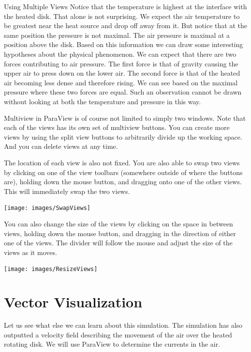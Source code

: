 \begin{exercise}{Using Multiple Views}
  Notice that the temperature is highest at the interface with the heated
  disk.  That alone is not surprising.  We expect the air temperature to be
  greatest near the heat source and drop off away from it.  But notice that
  at the same position the pressure is not maximal.  The air pressure is
  maximal at a position above the disk.  Based on this information we can
  draw some interesting hypotheses about the physical phenomenon.  We can
  expect that there are two forces contributing to air pressure.  The first
  force is that of gravity causing the upper air to press down on the lower
  air.  The second force is that of the heated air becoming less dense and
  therefore rising.  We can see based on the maximal pressure where these
  two forces are equal.  Such an observation cannot be drawn without
  looking at both the temperature and pressure in this way.
\end{exercise}

Multiview in ParaView is of course not limited to simply two windows.  Note
that each of the views has its own set of multiview buttons.  You can
create more views by using the split view buttons \splitViewH \splitViewV
to arbitrarily divide up the working space.  And you can delete views
\deleteView at any time.

The location of each view is also not fixed.  You are also able to swap two
views by clicking on one of the view toolbars (somewhere outside of where
the buttons are), holding down the mouse button, and dragging onto one of
the other views.  This will immediately swap the two views.

\begin{inlinefig}
  \texttt{[image: images/SwapViews]}
\end{inlinefig}

You can also change the size of the views by clicking on the space in
between views, holding down the mouse button, and dragging in the direction
of either one of the views.  The divider will follow the mouse and adjust
the size of the views as it moves.

\begin{inlinefig}
  \texttt{[image: images/ResizeViews]}
\end{inlinefig}


\section{Vector Visualization}

Let us see what else we can learn about this simulation.  The simulation
has also outputted a velocity field describing the movement of the air over
the heated rotating disk.  We will use ParaView to determine the currents
in the air.

